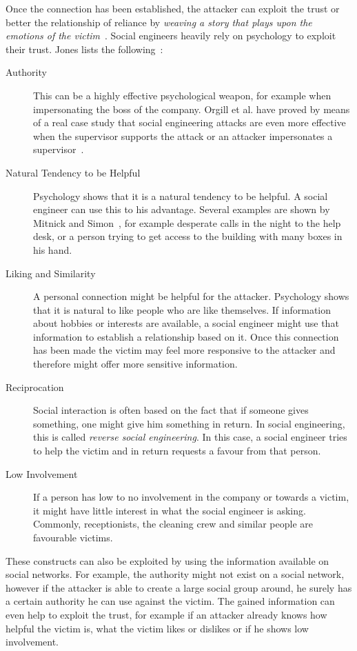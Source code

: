 Once the connection has been established, the attacker can exploit the trust or
better the relationship of reliance by \textit{\glqq{}weaving a story that plays upon
the emotions of the victim\grqq{}}~\cite{thornburgh2004}. Social engineers
heavily rely on psychology to exploit their trust. Jones lists the
following~\cite{jones2004}:

\begin{description}

\item[Authority] This can be a highly effective psychological weapon, for
  example when impersonating the boss of the company. Orgill et al. have
  proved by means of a real case study that social engineering attacks are even more
  effective when the supervisor supports the attack or an attacker
  impersonates a supervisor~\cite{orgill2004}.
\item[Natural Tendency to be Helpful] Psychology shows that it is a natural
  tendency to be helpful. A social engineer can use this to his advantage.
  Several examples are shown by Mitnick and Simon~\cite{mitnick2003}, for example
  desperate calls in the night to the help desk, or a person trying to get access
  to the building with many boxes in his hand.
\item[Liking and Similarity] A personal connection might be helpful for the
  attacker. Psychology shows that it is natural to like people who are like
  themselves. If information about hobbies or interests are available, a social
  engineer might use that information to establish a relationship based on 
  it. Once this connection has been made the victim may feel more
  responsive to the attacker and therefore might offer more sensitive
  information.
\item[Reciprocation] Social interaction is often based on the fact that if
  someone gives something, one might give him something in return. In social
  engineering, this is called \textit{reverse social engineering}. In this case, a
  social engineer tries to help the victim and in return requests a favour from
  that person.
\item[Low Involvement] If a person has low to no involvement in the company or
  towards a victim, it might have little interest in what the social engineer is
  asking. Commonly, receptionists, the cleaning crew and similar people are
  favourable victims.
\end{description}

These constructs can also be exploited by using the information available on social
networks. For example, the authority might not exist on a social network,
however if the attacker is able to create a large social group around, he surely
has a certain authority he can use against the victim. The gained information
can even help to exploit the trust, for example if an attacker already knows
how helpful the victim is, what the victim likes or dislikes or if he shows low
involvement.

